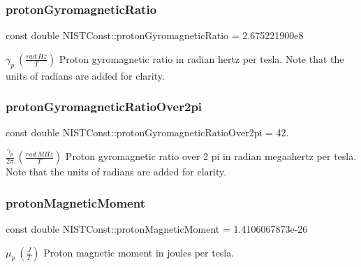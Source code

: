 \subsubsection{\texorpdfstring{proton\+Gyromagnetic\+Ratio}{protonGyromagneticRatio}}
{\footnotesize\ttfamily const double N\+I\+S\+T\+Const\+::proton\+Gyromagnetic\+Ratio = 2.\+675221900e8}

$\gamma_p \ (\frac{rad\ Hz}{T})$ Proton gyromagnetic ratio in radian hertz per tesla. Note that the units of radians are added for clarity. \mbox{\label{group___n_i_s_t_const-_proton_ga54ecf0d1090a1b2c9f7b301add8904b0}} 
\subsubsection{\texorpdfstring{proton\+Gyromagnetic\+Ratio\+Over2pi}{protonGyromagneticRatioOver2pi}}
{\footnotesize\ttfamily const double N\+I\+S\+T\+Const\+::proton\+Gyromagnetic\+Ratio\+Over2pi = 42.}

$\frac{\gamma_p}{2\pi} \ (\frac{rad\ MHz}{T})$ Proton gyromagnetic ratio over 2 pi in radian megaahertz per tesla. Note that the units of radians are added for clarity. \mbox{\label{group___n_i_s_t_const-_proton_ga931c9d53a62cee8eb68b4e930d0cf5a6}} 
\subsubsection{\texorpdfstring{proton\+Magnetic\+Moment}{protonMagneticMoment}}
{\footnotesize\ttfamily const double N\+I\+S\+T\+Const\+::proton\+Magnetic\+Moment = 1.\+4106067873e-\/26}

$\mu_p \ (\frac{J}{T})$ Proton magnetic moment in joules per tesla. \mbox{\label{group___n_i_s_t_const-_proton_gab71f8e2de250b48e9bbac602b69999de}} 
